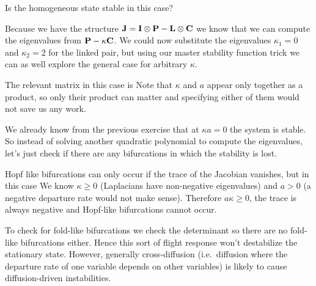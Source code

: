 \subquestion
Is the homogeneous state stable in this case?

\solution 
Because we have the structure ${\bf J}={\bf I}\otimes{\bf P}-{\bf L}\otimes {\bf C}$ we know that we can compute the eigenvalues from 
${\bf P}-\kappa {\bf C}$. We could now substitute the eigenvalues
$\kappa_1=0$ and $\kappa_2=2$ for the linked pair, but using our master stability function trick we can as well explore the general case for arbitrary $\kappa$. 

The relevant matrix in this case is 
Note that $\kappa$ and $a$ appear only together as a product, so only their product can matter and specifying either of them would not save us any work.

We already know from the previous exercise that at $\kappa a =0$ the system is stable. So instead of solving another quadratic polynomial to compute the eigenvalues, let's just check if there are any bifurcations in which the stability is lost. 

Hopf like bifurcations can only occur if the trace of the Jacobian vanishes, but in this case
We know $\kappa\geq 0$ (Laplacians have non-negative eigenvalues) and $a>0$ (a negative departure rate would not make sense). Therefore $a\kappa\geq 0$, the trace is always negative and Hopf-like bifurcations cannot occur. 

To check for fold-like bifurcations we check the determinant
so there are no fold-like bifurcations either. Hence this sort of flight response won't destabilize the stationary state. However, generally cross-diffusion (i.e.~diffusion where the departure rate of one variable depends on other variables) is likely to cause diffusion-driven instabilities.